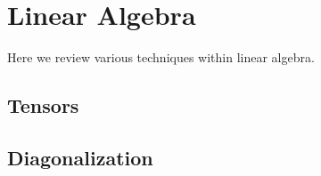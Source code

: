 \newpage
\chapter{Linear Algebra}
\label{app:lin-alg}
Here we review various techniques within linear algebra.


\section{Tensors}

\section{Diagonalization}
\label{sec:app-lin-alg-legendre}
